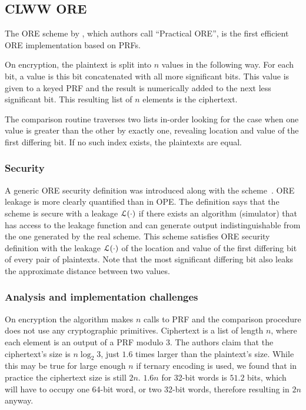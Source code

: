 \subsection{CLWW ORE}\label{sec:clww}

	The ORE scheme by \textcite{clww-ore}, which authors call ``Practical ORE'', is the first efficient ORE implementation based on PRFs.

	On encryption, the plaintext is split into $n$ values in the following way.
	For each bit, a value is this bit concatenated with all more significant bits.
	This value is given to a keyed PRF and the result is numerically added to the next less significant bit.
	This resulting list of $n$ elements is the ciphertext.

	The comparison routine traverses two lists in-order looking for the case when one value is greater than the other by exactly one, revealing location and value of the first differing bit.
	If no such index exists, the plaintexts are equal.

	\subsubsection{Security}
		A generic ORE security definition was introduced along with the scheme~\cite{clww-ore}.
		ORE leakage is more clearly quantified than in OPE\@.
		The definition says that the scheme is secure with a leakage $\mathcal{L}(\cdot)$ if there exists an algorithm (simulator) that has access to the leakage function and can generate output indistinguishable from the one generated by the real scheme.
		This scheme satisfies ORE security definition with the leakage $\mathcal{L}(\cdot)$ of the location and value of the first differing bit of every pair of plaintexts.
		Note that the most significant differing bit also leaks the approximate distance between two values.

	\subsubsection{Analysis and implementation challenges}

		On encryption the algorithm makes $n$ calls to PRF and the comparison procedure does not use any cryptographic primitives.
		Ciphertext is a list of length $n$, where each element is an output of a PRF modulo 3.
		The authors claim that the ciphertext's size is $n \log_2 3$, just $1.6$ times larger than the plaintext's size.
		While this may be true for large enough $n$ if ternary encoding is used, we found that in practice the ciphertext size is still $2n$.
		$1.6 n$ for 32-bit words is $51.2$ bits, which will have to occupy one 64-bit word, or two 32-bit words, therefore resulting in $2n$ anyway.
